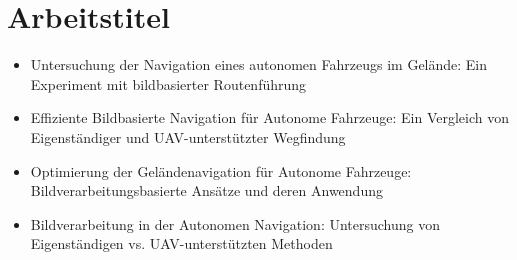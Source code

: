 \section{Arbeitstitel}

\begin{itemize}
    \item Untersuchung der Navigation eines autonomen Fahrzeugs im Gelände: Ein Experiment mit bildbasierter Routenführung
    \item Effiziente Bildbasierte Navigation für Autonome Fahrzeuge: Ein Vergleich von Eigenständiger und \ac{UAV}-unterstützter Wegfindung
    \item Optimierung der Geländenavigation für Autonome Fahrzeuge: Bildverarbeitungsbasierte Ansätze und deren Anwendung
    \item Bildverarbeitung in der Autonomen Navigation: Untersuchung von Eigenständigen vs. \ac{UAV}-unterstützten Methoden
\end{itemize}

